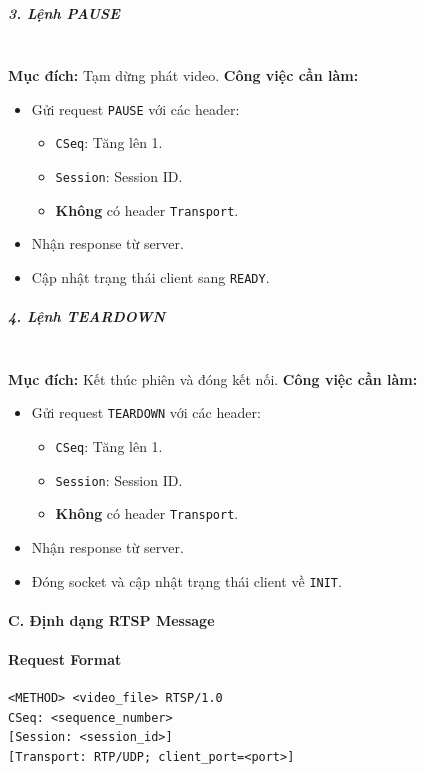 \subparagraph{3. Lệnh PAUSE}\mbox{}\\
\textbf{Mục đích:} Tạm dừng phát video.
\newline
\textbf{Công việc cần làm:}
\begin{itemize}
    \item Gửi request \texttt{PAUSE} với các header:
    \begin{itemize}
        \item \texttt{CSeq}: Tăng lên 1.
        \item \texttt{Session}: Session ID.
        \item \textbf{Không} có header \texttt{Transport}.
    \end{itemize}
    \item Nhận response từ server.
    \item Cập nhật trạng thái client sang \texttt{READY}.
\end{itemize}

\subparagraph{4. Lệnh TEARDOWN}\mbox{}\\
\textbf{Mục đích:} Kết thúc phiên và đóng kết nối.
\newline
\textbf{Công việc cần làm:}
\begin{itemize}
    \item Gửi request \texttt{TEARDOWN} với các header:
    \begin{itemize}
        \item \texttt{CSeq}: Tăng lên 1.
        \item \texttt{Session}: Session ID.
        \item \textbf{Không} có header \texttt{Transport}.
    \end{itemize}
    \item Nhận response từ server.
    \item Đóng socket và cập nhật trạng thái client về \texttt{INIT}.
\end{itemize}

\paragraph{C. Định dạng RTSP Message}

\paragraph{Request Format}
\begin{verbatim}
<METHOD> <video_file> RTSP/1.0
CSeq: <sequence_number>
[Session: <session_id>]
[Transport: RTP/UDP; client_port=<port>]
\end{verbatim}

